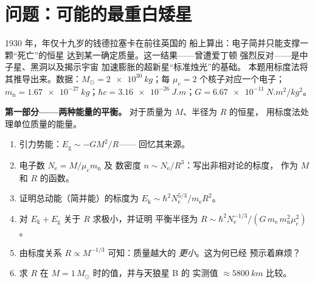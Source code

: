 \section{问题：可能的最重白矮星}

\begin{problem}\label{pb:b3:quantum-statistics:1}
1930 年，年仅十九岁的钱德拉塞卡在前往英国的
船上算出：电子简并只能支撑一颗“死亡”的恒星
达到某一确定质量。这一结果——曾遭爱丁顿
强烈反对——是中子星、黑洞以及揭示宇宙
加速膨胀的超新星“标准烛光”的基础。
本题用标度法将其推导出来。数据：$M_\odot =
\qty{2e30}{kg}$；每 $\mu_e = 2$ 个核子对应一个电子；$m_{\text{
n}} = \qty{1.67e-27}{kg}$；$\hbar c = \qty{3.16e-26}{J.m}$；$G =
\qty{6.67e-11}{N.m^2/kg^2}$。

\medskip\noindent\textbf{第一部分——两种能量的平衡。}
对于质量为 $M$、半径为 $R$ 的恒星，
用标度法处理单位质量的能量。
\begin{enumerate}
  \item 引力势能：$E_{\text{g}} \sim -GM^2/R$——
        回忆其来源。
  \item 电子数 $N_{\text{e}} = M/\mu_e m_{\text{n}}$ 及
        数密度 $n \sim N_{\text{e}}/R^3$：写出非相对论的标度，
        作为 $M$ 和
        $R$ 的函数。
  \item 证明总动能（简并能）的标度为
        $E_{\text{k}} \sim \hbar^2N_{\text{e}}^{5/3}/m_{\text{e}}
        R^2$。
  \item 对 $E_{\text{k}} + E_{\text{g}}$ 关于 $R$ 求极小，并证明
        平衡半径为
        $R \sim \hbar^2 N_{\text{e}}^{-1/3}/(G\,m_{\text{e}}\,
        m_{\text{n}}^2\mu_e^2)$。
  \item 由标度关系 $R \propto M^{-1/3}$ 可知：质量越大的
        \emph{更小}。这为何已经
        预示着麻烦？
  \item 求 $R$ 在 $M = 1\,M_\odot$ 时的值，并与天狼星 B 的
        实测值 $\approx\qty{5800}{km}$ 比较。
\end{enumerate}


\end{problem}
